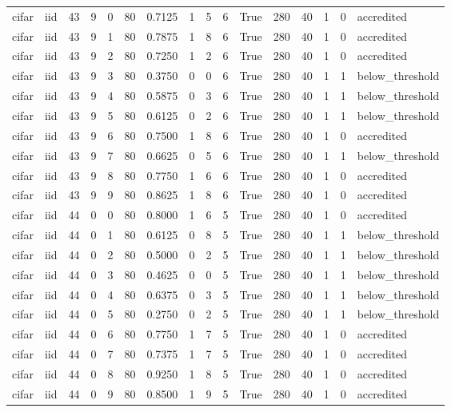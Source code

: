 \begin{tabular}{llrrrrrrrrrrrrrl}
cifar & iid & 43 & 9 & 0 & 80 & 0.7125 & 1 & 5 & 6 & True & 280 & 40 & 1 & 0 & accredited \\
cifar & iid & 43 & 9 & 1 & 80 & 0.7875 & 1 & 8 & 6 & True & 280 & 40 & 1 & 0 & accredited \\
cifar & iid & 43 & 9 & 2 & 80 & 0.7250 & 1 & 2 & 6 & True & 280 & 40 & 1 & 0 & accredited \\
cifar & iid & 43 & 9 & 3 & 80 & 0.3750 & 0 & 0 & 6 & True & 280 & 40 & 1 & 1 & below\_threshold \\
cifar & iid & 43 & 9 & 4 & 80 & 0.5875 & 0 & 3 & 6 & True & 280 & 40 & 1 & 1 & below\_threshold \\
cifar & iid & 43 & 9 & 5 & 80 & 0.6125 & 0 & 2 & 6 & True & 280 & 40 & 1 & 1 & below\_threshold \\
cifar & iid & 43 & 9 & 6 & 80 & 0.7500 & 1 & 8 & 6 & True & 280 & 40 & 1 & 0 & accredited \\
cifar & iid & 43 & 9 & 7 & 80 & 0.6625 & 0 & 5 & 6 & True & 280 & 40 & 1 & 1 & below\_threshold \\
cifar & iid & 43 & 9 & 8 & 80 & 0.7750 & 1 & 6 & 6 & True & 280 & 40 & 1 & 0 & accredited \\
cifar & iid & 43 & 9 & 9 & 80 & 0.8625 & 1 & 8 & 6 & True & 280 & 40 & 1 & 0 & accredited \\
cifar & iid & 44 & 0 & 0 & 80 & 0.8000 & 1 & 6 & 5 & True & 280 & 40 & 1 & 0 & accredited \\
cifar & iid & 44 & 0 & 1 & 80 & 0.6125 & 0 & 8 & 5 & True & 280 & 40 & 1 & 1 & below\_threshold \\
cifar & iid & 44 & 0 & 2 & 80 & 0.5000 & 0 & 2 & 5 & True & 280 & 40 & 1 & 1 & below\_threshold \\
cifar & iid & 44 & 0 & 3 & 80 & 0.4625 & 0 & 0 & 5 & True & 280 & 40 & 1 & 1 & below\_threshold \\
cifar & iid & 44 & 0 & 4 & 80 & 0.6375 & 0 & 3 & 5 & True & 280 & 40 & 1 & 1 & below\_threshold \\
cifar & iid & 44 & 0 & 5 & 80 & 0.2750 & 0 & 2 & 5 & True & 280 & 40 & 1 & 1 & below\_threshold \\
cifar & iid & 44 & 0 & 6 & 80 & 0.7750 & 1 & 7 & 5 & True & 280 & 40 & 1 & 0 & accredited \\
cifar & iid & 44 & 0 & 7 & 80 & 0.7375 & 1 & 7 & 5 & True & 280 & 40 & 1 & 0 & accredited \\
cifar & iid & 44 & 0 & 8 & 80 & 0.9250 & 1 & 8 & 5 & True & 280 & 40 & 1 & 0 & accredited \\
cifar & iid & 44 & 0 & 9 & 80 & 0.8500 & 1 & 9 & 5 & True & 280 & 40 & 1 & 0 & accredited \\

\end{tabular}
